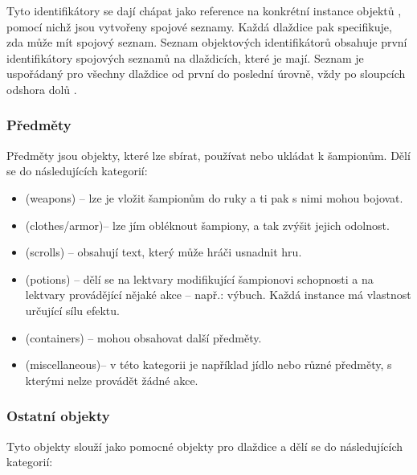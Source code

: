Tyto identifikátory se dají chápat jako reference na konkrétní instance objektů ,
pomocí nichž jsou vytvořeny spojové seznamy. Každá dlaždice pak specifikuje, zda může mít spojový seznam.
Seznam objektových identifikátorů obsahuje první identifikátory spojových seznamů na dlaždicích, které 
je mají. Seznam je uspořádaný pro všechny dlaždice od první do poslední úrovně, vždy po sloupcích odshora dolů .


\subsubsection{Předměty}\label{grabable-items}

Předměty jsou objekty, které lze sbírat, používat nebo ukládat k šampionům.
Dělí se do následujících kategorií:
\begin{itemize}
\item {} (weapons) -- lze je vložit šampionům do ruky a ti pak s nimi mohou bojovat.
\item {} (clothes/armor)-- lze jím obléknout šampiony, a tak zvýšit jejich odolnost.
\item {} (scrolls) -- obsahují text, který může hráči usnadnit hru.
\item {} (potions) -- dělí se na lektvary modifikující šampionovi schopnosti a na lektvary provádějící nějaké
	akce -- např.: výbuch. Každá instance má vlastnost určující sílu efektu.
\item {} (containers) -- mohou obsahovat další předměty.
\item {} (miscellaneous)-- v této kategorii je například jídlo nebo různé předměty, s kterými nelze provádět žádné akce.
\end{itemize}

\subsubsection{Ostatní objekty}
Tyto objekty slouží jako pomocné objekty pro dlaždice a dělí se do následujících kategorií:

